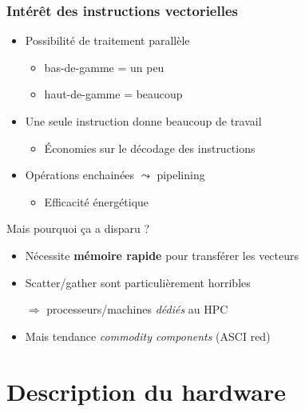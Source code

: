 \documentclass[xcolor={x11names,svgnames}]{beamer}
\newcommand{\red}[1]{{\color{red}#1}}
\begin{document}

\begin{frame}
  \frametitle{Intérêt des \red{instructions vectorielles}}
  
  \begin{itemize}
  \item Possibilité de traitement parallèle
    \begin{itemize}
    \item bas-de-gamme = un peu
    \item haut-de-gamme = beaucoup
    \end{itemize}

    \medskip
    
  \item Une seule instruction donne beaucoup de travail
    \begin{itemize}
    \item Économies sur le décodage des instructions
    \end{itemize}

    \medskip

  \item Opérations enchainées $\leadsto$ pipelining
    \begin{itemize}
    \item Efficacité énergétique
    \end{itemize}
  \end{itemize}

  \begin{alertblock}{Mais pourquoi ça a disparu ?}
    \begin{itemize}
    \item Nécessite \textbf{mémoire rapide} pour transférer les vecteurs
    \item Scatter/gather sont particulièrement horribles
    \item[$\Rightarrow$] processeurs/machines \emph{dédiés} au HPC
    \item Mais tendance \og \textit{commodity components}\fg{} (ASCI red)
    \end{itemize}
  \end{alertblock}  
\end{frame}


\section{Description du hardware}
\end{document}
